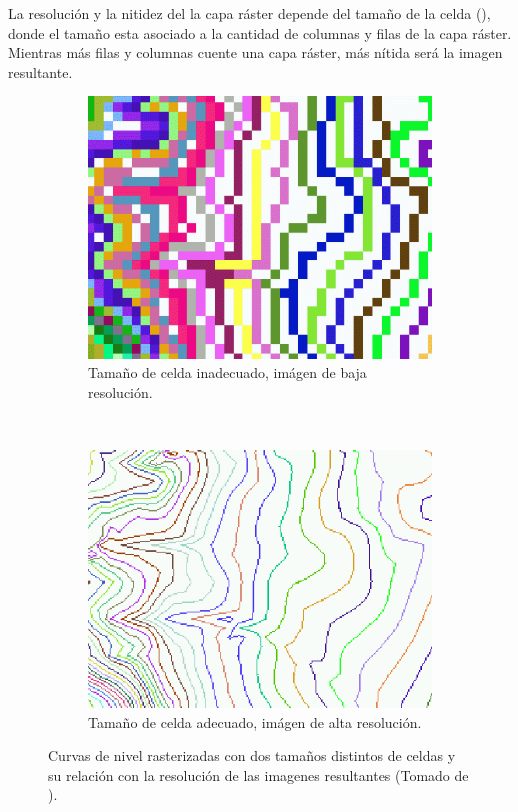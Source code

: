 La resolución y la nitidez del la capa ráster depende del tamaño de la celda
(), donde el tamaño esta asociado a la cantidad de columnas y
filas de la capa ráster. Mientras más filas y columnas cuente una capa ráster, más nítida será la
imagen resultante.


\begin{figure}[!htbp]
    \centering
    \begin{subfigure}[b]{0.4\textwidth}
            \includegraphics[width=\textwidth]{capitulo-2/graphics/raster-baja-resolucion.png}
            \caption{Tamaño de celda inadecuado, imágen de baja resolución.}
    \end{subfigure}
    ~~~~
    \begin{subfigure}[b]{0.4\textwidth}
            \includegraphics[width=\textwidth]{capitulo-2/graphics/raster-alta-resolucion.png}
            \caption{Tamaño de celda adecuado, imágen de alta resolución.}

    \end{subfigure}
    \caption{\label{fig:sig-raster-resolucion}Curvas de nivel rasterizadas con dos tamaños distintos de celdas y su relación con la resolución de las imagenes resultantes (Tomado de \cite{fAlonsoSig2006}).}
\end{figure}

